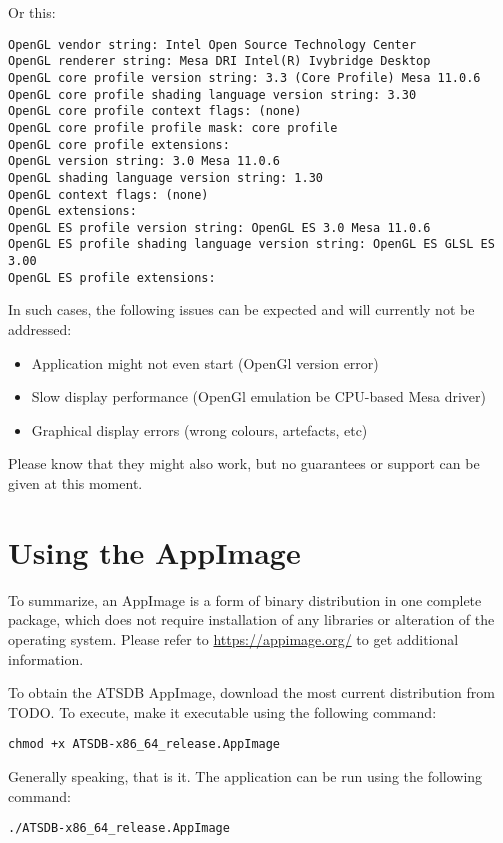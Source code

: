 Or this:

\begin{verbatim}
OpenGL vendor string: Intel Open Source Technology Center
OpenGL renderer string: Mesa DRI Intel(R) Ivybridge Desktop 
OpenGL core profile version string: 3.3 (Core Profile) Mesa 11.0.6
OpenGL core profile shading language version string: 3.30
OpenGL core profile context flags: (none)
OpenGL core profile profile mask: core profile
OpenGL core profile extensions:
OpenGL version string: 3.0 Mesa 11.0.6
OpenGL shading language version string: 1.30
OpenGL context flags: (none)
OpenGL extensions:
OpenGL ES profile version string: OpenGL ES 3.0 Mesa 11.0.6
OpenGL ES profile shading language version string: OpenGL ES GLSL ES 3.00
OpenGL ES profile extensions:
\end{verbatim}

In such cases, the following issues can be expected and will currently not be addressed:

\begin{itemize} 
\item Application might not even start (OpenGl version error)
\item Slow display performance (OpenGl emulation be CPU-based Mesa driver)
\item Graphical display errors (wrong colours, artefacts, etc) 
\end{itemize} 

Please know that they might also work, but no guarantees or support can be given at this moment.

\section{Using the AppImage}

To summarize, an AppImage is a form of binary distribution in one complete package, which does not require installation of any libraries or alteration of the operating system. Please refer to \url{https://appimage.org/} to get additional information.

To obtain the ATSDB AppImage, download the most current distribution from TODO. To execute, make it executable using the following command:
\begin{verbatim}
chmod +x ATSDB-x86_64_release.AppImage
\end{verbatim}

Generally speaking, that is it. The application can be run using the following command:
\begin{verbatim}
./ATSDB-x86_64_release.AppImage
\end{verbatim}


